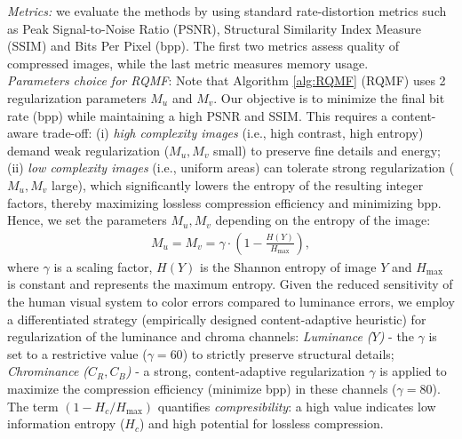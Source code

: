 \documentclass[lettersize,journal]{IEEEtran}
\newcommand{\dl}{\textcolor{blue}}
\begin{document}
\noindent \textit{Metrics:}  we evaluate the methods by using standard rate-distortion metrics such as Peak Signal-to-Noise Ratio (PSNR), Structural Similarity Index Measure (SSIM) and Bits Per Pixel (bpp). The first two metrics assess quality of  compressed images, while the last metric measures memory usage.\\

\noindent  \textit{Parameters choice for RQMF}: Note that Algorithm \ref{alg:RQMF} (RQMF) uses 2 regularization parameters $M_u$ and $M_v$. Our objective is to minimize the final bit rate (bpp) while maintaining a high PSNR and SSIM. This requires a content-aware trade-off: (i) \textit{high complexity images} (i.e., high contrast, high entropy) demand weak regularization ($M_u, M_v$ small) to preserve fine details and energy; (ii) \textit{low complexity images} (i.e., uniform areas) can tolerate strong regularization ($M_u, M_v$ large), which significantly lowers the entropy of the resulting integer factors, thereby maximizing lossless compression efficiency and minimizing bpp.
Hence, we set the parameters $M_u, M_v$ depending on the entropy of the image:
\begin{align}
\label{eq:M}
M_u = M_v = \gamma \cdot \left( 1 - \frac{H(Y)}{H_{\max}} \right),
\end{align}
where $\gamma$ is a scaling factor, $H(Y)$ is the Shannon entropy of image $Y$ and $H_{\max}$ is constant and represents the maximum entropy. Given the reduced sensitivity of the human visual system to color errors compared to luminance errors, we employ a differentiated strategy (empirically designed content-adaptive heuristic) for regularization of the luminance and chroma channels: \textit{Luminance ($Y$)} - the $\gamma$  is set to a restrictive value ($\gamma = 60$)  to strictly preserve structural details; \textit{Chrominance ($C_R, C_B$)} - a strong, content-adaptive regularization $\gamma$ is applied to maximize the compression efficiency (minimize bpp) in these channels ($\gamma = 80$). %
The term $\left( 1 - H_c/H_{\max} \right)$ quantifies \textit{compresibility}: a high value indicates low information entropy ($H_c$) and high potential for lossless compression. 
\end{document}
